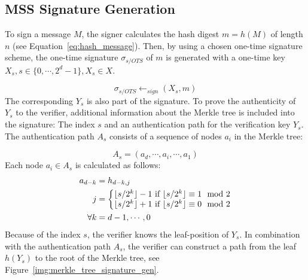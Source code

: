 \subsection{MSS Signature Generation}
To sign a message $M$, the signer calculates the hash digest $m = h(M)$ of length $n$ (see Equation~\ref{eq:hash_message}). Then, by using a chosen one-time signature scheme, the one-time signature $\sigma_{s/OTS}$ of $m$ is generated with a one-time key $X_s, s \in \{0, \cdots, 2^d - 1\}, X_s \in X$. 

\begin{equation}
\label{eq:merkle_s/OTS_signature}
\sigma_{s/OTS} \leftarrow_{sign} (X_s, m) 
\end{equation}
The corresponding $Y_s$ is also part of the signature.
To prove the authenticity of $Y_s$ to the verifier, additional information about the Merkle tree is included into the signature: The index $s$ and an authentication path for the verification key $Y_s$. The authentication path $A_s$ consists of a sequence of nodes $a_i$ in the Merkle tree:
 
\begin{equation}
A_s = (a_d,\cdots, a_i, \cdots, a_{1})
\end{equation}
Each node $a_i \in A_s$ is calculated as follows:
\begin{align}
\label{eq:auth_path_calculation_merkle_tree}
a_{d-k} &= h_{d-k, j} \\
j &= 
\left\{\begin{matrix} \nonumber
\lfloor s/2^k\rfloor-1 \text{ if } \lfloor s/2^k\rfloor \equiv 1 \mod{2} \\
\lfloor s/2^k\rfloor+1 \text{ if } \lfloor s/2^k\rfloor \equiv 0 \mod{2}
\end{matrix}\right.  \nonumber \\
\forall k &= d-1, \cdots, 0 \nonumber 
\end{align}
Because of the index $s$, the verifier knows the leaf-position of $Y_s$. In combination with the authentication path $A_s$, the verifier can construct a path from the leaf $h(Y_s)$ to the root of the Merkle tree, see Figure~\ref{img:merkle_tree_signature_gen}. %


